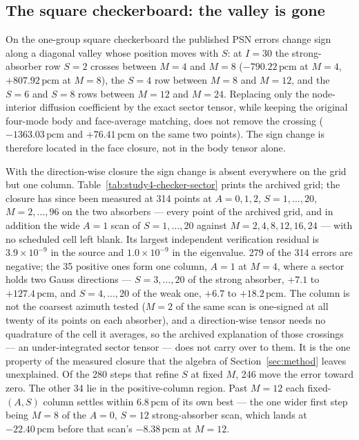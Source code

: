 \documentclass[11pt,a4paper]{article}
\newcommand{\pcm}{\,\mathrm{pcm}}
\begin{document}
\subsection{The square checkerboard: the valley is gone}
\label{sec:checker}
On the one-group square checkerboard the published PSN errors change sign along a
diagonal valley whose position moves with $S$: at $I{=}30$ the strong-absorber row
$S{=}2$ crosses between $M{=}4$ and $M{=}8$ ($-790.22\pcm$ at $M{=}4$, $+807.92\pcm$
at $M{=}8$), the $S{=}4$ row between $M{=}8$ and $M{=}12$, and the $S{=}6$ and $S{=}8$
rows between $M{=}12$ and $M{=}24$. Replacing only the node-interior diffusion
coefficient by the exact sector tensor, while keeping the original four-mode body and
face-average matching, does not remove the crossing ($-1363.03\pcm$ and $+76.41\pcm$
on the same two points). The sign change is therefore located in the face closure,
not in the body tensor alone.

With the direction-wise closure the sign change is absent everywhere on the grid but
one column. Table~\ref{tab:study4-checker-sector} prints the archived grid; the closure
has since been measured at 314 points at
$A{=}0,1,2$, $S{=}1,\ldots,20$, $M{=}2,\ldots,96$ on the two absorbers --- every point of
the archived grid, and in addition the wide $A{=}1$ scan of $S{=}1,\ldots,20$ against
$M{=}2,4,8,12,16,24$ --- with no scheduled cell left blank. Its largest independent verification
residual is $3.9\times10^{-9}$ in the source and $1.0\times10^{-9}$ in the eigenvalue. 279 of the
314 errors are negative; the 35 positive ones form one column, $A{=}1$ at $M{=}4$, where
a sector holds two Gauss directions --- $S{=}3,\ldots,20$ of the strong absorber,
$+7.1$ to $+127.4\pcm$, and $S{=}4,\ldots,20$ of the weak one, $+6.7$ to
$+18.2\pcm$. The column is not the coarsest azimuth tested ($M{=}2$ of the same scan is
one-signed at all twenty of its points on each absorber), and a direction-wise tensor needs no quadrature
of the cell it averages, so the archived explanation of those crossings --- an
under-integrated sector tensor --- does not carry over to them. It is the one property
of the measured closure that the algebra of Section~\ref{sec:method} leaves unexplained.
Of the 280 steps that refine $S$ at fixed $M$, 246 move the error toward zero. The
other 34 lie in the positive-column region. Past $M{=}12$ each fixed-$(A,S)$ column
settles within $6.8\pcm$ of its own best --- the
one wider first step being $M{=}8$ of the $A{=}0$, $S{=}12$ strong-absorber scan, which
lands at $-22.40\pcm$ before that scan's $-8.38\pcm$ at $M{=}12$.
\end{document}

